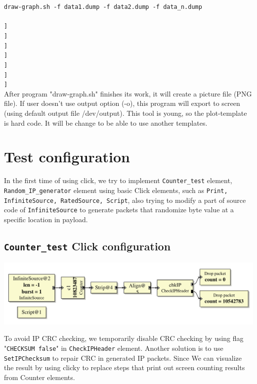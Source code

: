 \documentclass[a4paper]{article}
\begin{document}
\begin{enumerate}
\begin{flushleft}
\texttt{draw-graph.sh -f data1.dump -f data2.dump -f data\_n.dump\\
[-o PNG\_FILES]\\
      [[--plot-type COUNT (default) | RATE | DENSITY]]\\
      [[--xrange 233:23221]]\\
      [[--yrange 282:2922]]\\
      [[--xlabel XYZ]]\\
      [[--ylabel ABC]]\\
      [[--xcol 2]]\\
      [[--ycol 1]]}\\
  After program "draw-graph.sh" finishes its work, it will create a picture file (PNG file). If user doesn't use output option (-o), this program will export to screen (using default output file /dev/output). This tool is young, so the plot-template is hard code. It will be change to be able to use another templates.\end{flushleft}
      \end{enumerate}  
  \section{Test configuration}
  In the first time of using click, we try to implement \texttt{Counter\_test} element, \texttt{Random\_IP\_generator} element using basic Click elements, such as \texttt{Print, InfiniteSource, RatedSource, Script}, also trying to modify a part of source code of \texttt{InfiniteSource} to generate packets that randomize byte value at a specific location in payload.
  \subsection{\texttt{Counter\_test} Click configuration}
  \begin{center}
	  \includegraphics[scale=0.6]{../1-test-config/counter_test.pdf}
	  \label{fig:countertest}
  \end{center}
  To avoid IP CRC checking, we temporarily disable CRC checking by using flag "\texttt{CHECKSUM false}" in \texttt{CheckIPHeader} element. Another solution is to use \texttt{SetIPChecksum} to repair CRC in generated IP packets. Since We can visualize the result by using clicky to replace steps that print out screen counting results from Counter elements. 
\end{document}
